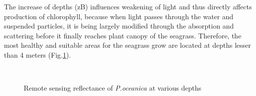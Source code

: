 \documentclass[11pt]{article}
\begin{document}
The increase of depths (zB) influences weakening of light and thus directly affects
production of chlorophyll, because when light passes through the water and suspended particles, it is
being largely modified through the absorption and scattering before it finally reaches plant canopy of
the seagrass. Therefore, the most healthy and suitable areas for the seagrass grow are located at depths
lesser than 4 meters (Fig.\ref{fig:4.9}).

\begin{figure}[H]
	\centering
	\\
	\caption{Remote sensing reflectance of \textit{P.oceanica} at various depths}
	\label{fig:4.9}
\end{figure}
\end{document}
